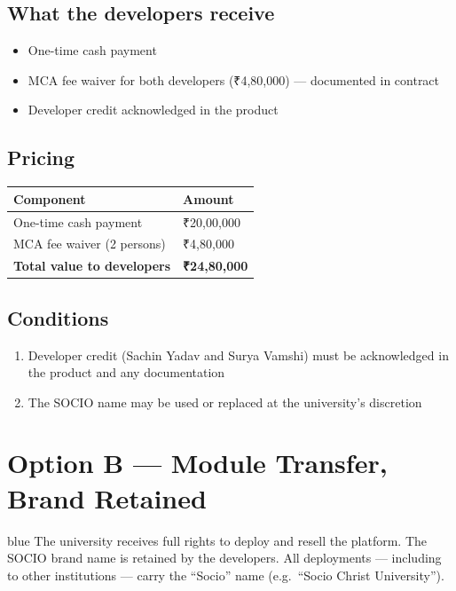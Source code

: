 \documentclass[12pt,a4paper]{article}
\begin{document}
\subsection*{What the developers receive}
\begin{itemize}[leftmargin=*, noitemsep]
    \item One-time cash payment
    \item MCA fee waiver for both developers (₹4,80,000) — documented in contract
    \item Developer credit acknowledged in the product
\end{itemize}

\subsection*{Pricing}

\begin{tabularx}{\textwidth}{L{5cm} X}
\toprule
{}
\textbf{Component} & \textbf{Amount} \\
\midrule
One-time cash payment & ₹20,00,000 \\
MCA fee waiver (2 persons) & ₹4,80,000 \\
\textbf{Total value to developers} & \textbf{₹24,80,000} \\
\bottomrule
\end{tabularx}

\subsection*{Conditions}
\begin{enumerate}[leftmargin=*, noitemsep]
    \item Developer credit (Sachin Yadav and Surya Vamshi) must be acknowledged in the product and any documentation
    \item The SOCIO name may be used or replaced at the university's discretion
\end{enumerate}

\newpage
\section{Option B — Module Transfer, Brand Retained}

\begin{scenariobox}{blue}
The university receives full rights to deploy and resell the platform. The SOCIO brand name is retained by the developers. All deployments — including to other institutions — carry the ``Socio'' name (e.g.\ ``Socio Christ University'').
\end{scenariobox}
\end{document}
